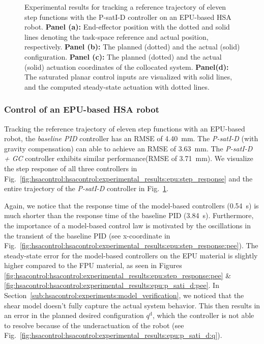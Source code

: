 \begin{figure}[ht]
    \caption{Experimental results for tracking a reference trajectory of eleven step functions with the P-satI-D controller on an EPU-based HSA robot. \textbf{Panel (a):} End-effector position with the dotted and solid lines denoting the task-space reference and actual position, respectively.
    \textbf{Panel (b):} The planned (dotted) and the actual (solid) configuration. 
    \textbf{Panel (c):} The planned (dotted) and the actual (solid) actuation coordinates of the collocated system. 
    \textbf{Panel(d):} The saturated planar control inputs are visualized with solid lines, and the computed steady-state actuation with dotted lines.}\label{fig:hsacontrol:hsacontrol:experimental_results:epu:p_sati_d}
\end{figure}

\subsubsection{Control of an EPU-based HSA robot}
Tracking the reference trajectory of eleven step functions with an EPU-based robot, the \emph{baseline PID} controller has an \gls{RMSE} of \SI{4.40}{mm}. The \emph{P-satI-D} (with gravity compensation) can able to achieve an \gls{RMSE} of \SI{3.63}{mm}. The \emph{P-satI-D + GC} controller exhibits similar performance(\gls{RMSE} of \SI{3.71}{mm}).
We visualize the step response of all three controllers in Fig.~\ref{fig:hsacontrol:hsacontrol:experimental_results:epu:step_response} and the entire trajectory of the \emph{P-satI-D} controller in Fig.~\ref{fig:hsacontrol:hsacontrol:experimental_results:epu:p_sati_d}.

Again, we notice that the response time of the model-based controllers (\SI{0.54}{s}) is much shorter than the response time of the baseline PID (\SI{3.84}{s}). Furthermore, the importance of a model-based control law is motivated by the oscillations in the transient of the baseline PID (see x-coordinate in Fig.~\ref{fig:hsacontrol:hsacontrol:experimental_results:epu:step_response:pee}).
The steady-state error for the model-based controllers on the EPU material is slightly higher compared to the FPU material, as seen in Figures \ref{fig:hsacontrol:hsacontrol:experimental_results:epu:step_response:pee} \& \ref{fig:hsacontrol:hsacontrol:experimental_results:epu:p_sati_d:pee}. In Section~\ref{sub:hsacontrol:experiments:model_verification}, we noticed that the shear model doesn't fully capture the actual system behavior. This then results in an error in the planned desired configuration $q^\mathrm{d}$, which the controller is not able to resolve because of the underactuation of the robot (see Fig.~\ref{fig:hsacontrol:hsacontrol:experimental_results:epu:p_sati_d:q}).

